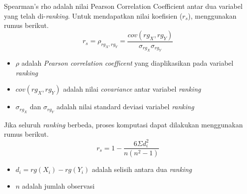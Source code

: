 Spearman's rho adalah nilai Pearson Correlation Coefficient antar dua variabel yang telah di-\textit{ranking}. Untuk mendapatkan nilai koefisien ($r_s$), menggunakan rumus berikut.
\begin{equation}
r_s = \rho_{rg_X,rg_Y} = \frac{cov(rg_X,rg_Y)}{\sigma_{rg_X}\sigma_{rg_Y}}
\end{equation}
\begin{itemize}
  \item $\rho$ adalah \textit{Pearson correlation coefficent} yang diaplikasikan pada variabel \textit{ranking}
  \item $cov(rg_X,rg_Y)$ adalah nilai \textit{covariance} antar variabel \textit{ranking}
  \item $\sigma_{rg_X}$ dan $\sigma_{rg_Y}$ adalah nilai standard deviasi variabel \textit{ranking}
\end{itemize}

\noindent Jika seluruh \textit{ranking} berbeda, proses komputasi dapat dilakukan menggunakan rumus berikut.
\begin{equation}
r_s = 1-\frac{6 \Sigma d_i^2}{n(n^2-1)}
\end{equation}
\begin{itemize}
  \item $d_i = rg(X_i)-rg(Y_i)$ adalah selisih antara dua \textit{ranking}
  \item $n$ adalah jumlah observasi
\end{itemize}



